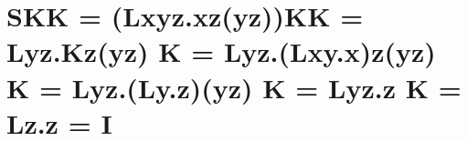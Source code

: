 \documentclass{article}
\date{}
\begin{document}
\maketitle


\section{SKK
= (Lxyz.xz(yz))KK = Lyz.Kz(yz) K = Lyz.(Lxy.x)z(yz) K = Lyz.(Ly.z)(yz) K = Lyz.z K = Lz.z = I}
\end{document}
